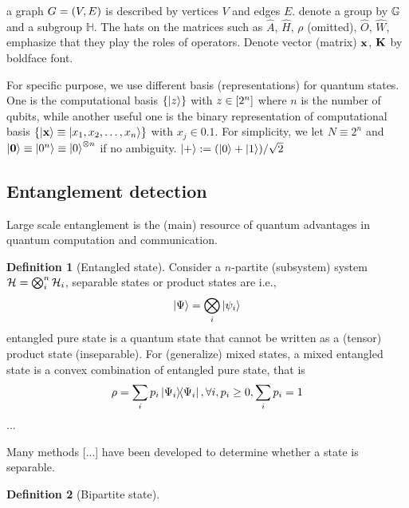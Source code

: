 \documentclass[
10pt,
aps,
pra,
linenumbers,
floatfix,
]{revtex4-2}
\theoremstyle{plain}
\theoremstyle{definition}
\newtheorem{definition}{Definition}
\newtheorem{example}{Example}
\newcommand{\hamiltonian}{\hat{H}}
\newcommand{\ew}{\hat{W}}
\newcommand{\ob}{\hat{O}}
\newcommand{\subgroup}{\mathbb{H}}
\newcommand{\dm}{\rho}
\begin{document}
a graph $G=(V,E)$ is described by vertices $V$ and edges $E$.
denote a group by $\mathbb{G}$ and a subgroup $\subgroup$. 
The hats on the matrices such as $\hat{A}$, $\hamiltonian$, $\dm$ (omitted), $\ob$, $\ew$, emphasize that they play the roles of operators.
Denote vector (matrix) $\vb{x}$, $\vb{K}$ by boldface font.

For specific purpose, we use different basis (representations) for quantum states.
One is the computational basis $\qty{\ket{z}}$ with $z\in \qty[2^n]$ where $n$ is the number of qubits,
while another useful one is the binary representation of computational basis $\qty{\ket{\vb{x}}\equiv\ket{x_1,x_2,\dots,x_n}}$ with $x_j\in \qty{0,1}$. 
For simplicity, we let $N \equiv 2^n$ and $\ket{\vb{0}}\equiv\ket{0^n} \equiv\ket{0}^{\otimes n}$ if no ambiguity.
$\ket{+}: = (\ket{0}+\ket{1})/\sqrt{2} $

\subsection{Entanglement detection}
Large scale entanglement is the (main) resource of quantum advantages in quantum computation and communication.
\begin{definition}[Entangled state]\label{def:entangled_state}
	Consider a $n$-partite (subsystem) system $\mathcal{H}=\bigotimes_i^n \mathcal{H}_i$,
	separable states or product states are i.e.,
	\begin{equation}
		\ket{\Psi} = \bigotimes_i \ket{\psi_i}
	\end{equation}
	entangled pure state is a quantum state that cannot be written as a (tensor) product state (inseparable). 
	For (generalize) mixed states, a mixed entangled state is a convex combination of entangled pure state, that is
	\begin{equation}
		\rho = \sum_i p_i\op{\Psi_i},\forall i,p_i\ge 0, \sum_i p_i =1
	\end{equation}
		...
\end{definition}
Many methods [...] have been developed to determine whether a state is separable.
\begin{definition}[Bipartite state]
\end{definition}
\end{document}
